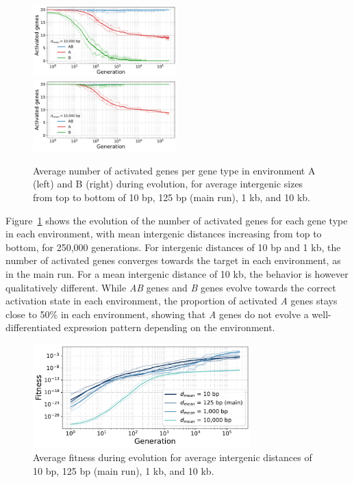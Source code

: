 \begin{figure}[H]
\includegraphics[width=0.495\textwidth]{param/mean-intergene/inter-10k/gene_activity_env_A.pdf}
\includegraphics[width=0.495\textwidth]{param/mean-intergene/inter-10k/gene_activity_env_B.pdf}
\caption[Evolution of the number of activated genes in each environment, with increasing mean intergenic distances]{Average number of activated genes per gene type in environment A (left) and B (right) during evolution, for average intergenic sizes from top to bottom of 10 bp, 125 bp (main run), 1 kb, and 10 kb.}
\label{fig:param:mean-intergene-activ-by-env}
\end{figure}

Figure~\ref{fig:param:mean-intergene-activ-by-env} shows the evolution of the number of activated genes for each gene type in each environment, with mean intergenic distances increasing from top to bottom, for 250,000 generations.
For intergenic distances of 10 bp and 1 kb, the number of activated genes converges towards the target in each environment, as in the main run.
For a mean intergenic distance of 10 kb, the behavior is however qualitatively different.
While \emph{AB} genes and \emph{B} genes evolve towards the correct activation state in each environment, the proportion of activated \emph{A} genes stays close to 50\% in each environment, showing that \emph{A} genes do not evolve a well-differentiated expression pattern depending on the environment.

\begin{figure}[H]
\centering
\includegraphics[width=0.75\textwidth]{param/mean-intergene/fitness_all_with_main.pdf}
\caption[Average fitness during evolution, with increasing mean intergenic distances]{Average fitness during evolution for average intergenic distances of 10 bp, 125 bp (main run), 1 kb, and 10 kb.}
\label{fig:param:mean-intergene-fitness}
\end{figure}


